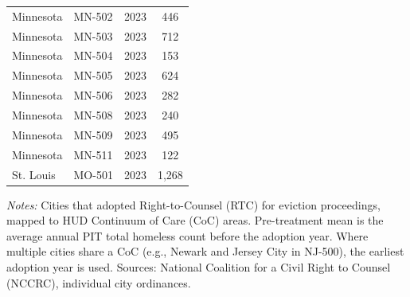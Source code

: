 \begin{table}[htbp]
\begin{tabular}{llcc}
Minnesota & MN-502 & 2023 & 446 \\
Minnesota & MN-503 & 2023 & 712 \\
Minnesota & MN-504 & 2023 & 153 \\
Minnesota & MN-505 & 2023 & 624 \\
Minnesota & MN-506 & 2023 & 282 \\
Minnesota & MN-508 & 2023 & 240 \\
Minnesota & MN-509 & 2023 & 495 \\
Minnesota & MN-511 & 2023 & 122 \\
St. Louis & MO-501 & 2023 & 1,268 \\
\hline\hline
\end{tabular}
\begin{tablenotes}
\item \textit{Notes:} Cities that adopted Right-to-Counsel (RTC) for eviction proceedings, mapped to HUD Continuum of Care (CoC) areas. Pre-treatment mean is the average annual PIT total homeless count before the adoption year. Where multiple cities share a CoC (e.g., Newark and Jersey City in NJ-500), the earliest adoption year is used. Sources: National Coalition for a Civil Right to Counsel (NCCRC), individual city ordinances.
\end{tablenotes}
\end{table}
